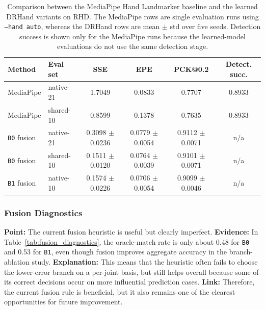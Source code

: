 \documentclass[10pt,letterpaper]{article}
\begin{document}
\begin{table}[H]
\centering
\footnotesize
\caption{Comparison between the MediaPipe Hand Landmarker baseline and the learned DRHand variants on RHD. The MediaPipe rows are single evaluation runs using \texttt{--hand auto}, whereas the DRHand rows are mean $\pm$ std over five seeds. Detection success is shown only for the MediaPipe runs because the learned-model evaluations do not use the same detection stage.}
\label{tab:mediapipe_baseline}
\begin{tabular}{llcccc}
\toprule
Method & Eval set & SSE & EPE & PCK@0.2 & Detect. succ. \\
\midrule
MediaPipe & native-21 & 1.7049 & 0.0833 & 0.7707 & 0.8933 \\
MediaPipe & shared-10 & 0.8599 & 0.1378 & 0.7635 & 0.8933 \\
\texttt{B0} fusion & native-21 & 0.3098 $\pm$ 0.0236 & 0.0779 $\pm$ 0.0054 & 0.9112 $\pm$ 0.0071 & n/a \\
\texttt{B0} fusion & shared-10 & 0.1511 $\pm$ 0.0120 & 0.0764 $\pm$ 0.0039 & 0.9101 $\pm$ 0.0071 & n/a \\
\texttt{B1} fusion & native-10 & 0.1574 $\pm$ 0.0226 & 0.0706 $\pm$ 0.0054 & 0.9099 $\pm$ 0.0046 & n/a \\
\bottomrule
\end{tabular}
\end{table}

\subsubsection{Fusion Diagnostics}

\medskip
\noindent\textbf{Point:} The current fusion heuristic is useful but clearly imperfect.  
\textbf{Evidence:} In Table~\ref{tab:fusion_diagnostics}, the oracle-match rate is only about 0.48 for \texttt{B0} and 0.53 for \texttt{B1}, even though fusion improves aggregate accuracy in the branch-ablation study.  
\textbf{Explanation:} This means that the heuristic often fails to choose the lower-error branch on a per-joint basis, but still helps overall because some of its correct decisions occur on more influential prediction cases.  
\textbf{Link:} Therefore, the current fusion rule is beneficial, but it also remains one of the clearest opportunities for future improvement.
\end{document}
